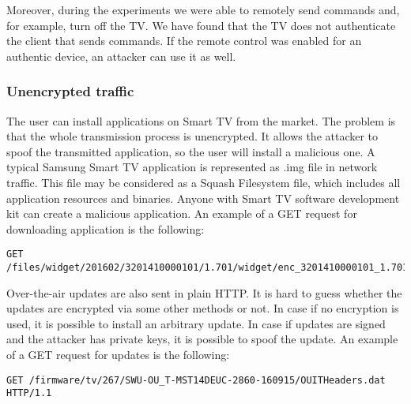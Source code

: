 Moreover, during the experiments we were able to remotely send commands and, for example, turn off the TV. We have found that the TV does not authenticate the client that sends commands. If the remote control was enabled for an authentic device, an attacker can use it as well.

\subsubsection{Unencrypted traffic}

The user can install applications on Smart TV from the market. The problem is that the whole transmission process is unencrypted. It allows the attacker to spoof the transmitted application, so the user will install a malicious one. A typical Samsung Smart TV application is represented as .img file in network traffic. This file may be considered as a Squash Filesystem file, which includes all application resources and binaries. Anyone with Smart TV software development kit can create a malicious application. An example of a GET request for downloading application is the following:

\begin{lstlisting}
GET /files/widget/201602/3201410000101/1.701/widget/enc_3201410000101_1.701.img
\end{lstlisting}

Over-the-air updates are also sent in plain HTTP. It is hard to guess whether the updates are encrypted via some other methods or not. In case if no encryption is used, it is possible to install an arbitrary update. In case if updates are signed and the attacker has private keys, it is possible to spoof the update. An example of a GET request for updates is the following:

\begin{lstlisting}
GET /firmware/tv/267/SWU-OU_T-MST14DEUC-2860-160915/OUITHeaders.dat HTTP/1.1
\end{lstlisting}

